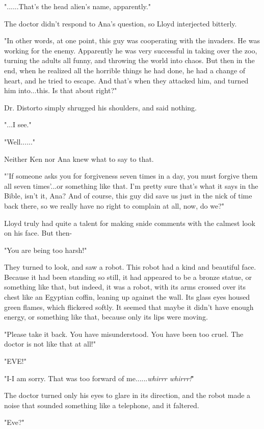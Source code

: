 \documentclass[
]{article}
\begin{document}
"......That's the head alien's name, apparently."

The doctor didn't respond to Ana's question, so Lloyd interjected
bitterly.

"In other words, at one point, this guy was cooperating with the
invaders. He was working for the enemy. Apparently he was very
successful in taking over the zoo, turning the adults all funny, and
throwing the world into chaos. But then in the end, when he realized all
the horrible things he had done, he had a change of heart, and he tried
to escape. And that's when they attacked him, and turned him
into...this. Is that about right?"

Dr. Distorto simply shrugged his shoulders, and said nothing.

"...I see."

"Well......"

Neither Ken nor Ana knew what to say to that.

"'If someone asks you for forgiveness seven times in a day, you must
forgive them all seven times'...or something like that. I'm pretty sure
that's what it says in the Bible, isn't it, Ana? And of course, this guy
did save us just in the nick of time back there, so we really have no
right to complain at all, now, do we?"

Lloyd truly had quite a talent for making snide comments with the
calmest look on his face. But then-

"You are being too harsh!"

They turned to look, and saw a robot. This robot had a kind and
beautiful face. Because it had been standing so still, it had appeared
to be a bronze statue, or something like that, but indeed, it was a
robot, with its arms crossed over its chest like an Egyptian coffin,
leaning up against the wall. Its glass eyes housed green flames, which
flickered softly. It seemed that maybe it didn't have enough energy, or
something like that, because only its lips were moving.

"Please take it back. You have misunderstood. You have been too cruel.
The doctor is not like that at all!"

"EVE!"

"I-I am sorry. That was too forward of me......\emph{whirrr whirrr!}"

The doctor turned only his eyes to glare in its direction, and the robot
made a noise that sounded something like a telephone, and it faltered.

"Eve?"
\end{document}
